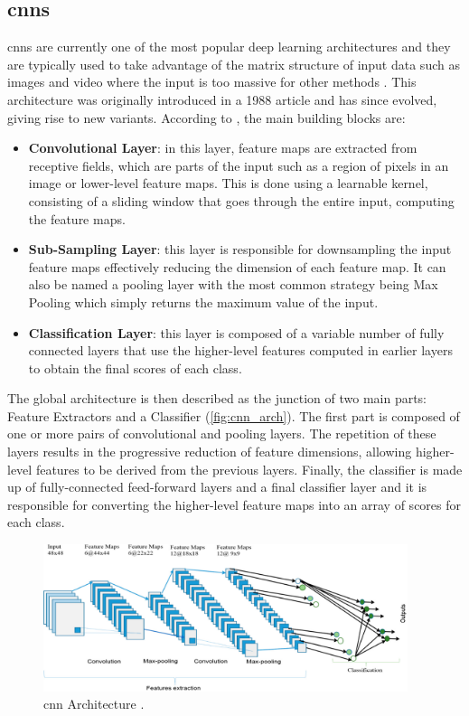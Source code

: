 \subsection{\acfp{cnn}}

\acfp{cnn} are currently one of the most popular deep learning architectures and they are typically used to take advantage of the matrix structure of input data such as images and video where the input is too massive for other methods \cite{Sarker2021}. This architecture was originally introduced in a 1988 article \cite{Fukushima1988} and has since evolved, giving rise to new variants. According to \textcite{Alom2019}, the main building blocks are:
\begin{itemize}
    \item \textbf{Convolutional Layer}: in this layer, feature maps are extracted from receptive fields, which are parts of the input such as a region of pixels in an image or lower-level feature maps. This is done using a learnable kernel, consisting of a sliding window that goes through the entire input, computing the feature maps.

    \item \textbf{Sub-Sampling Layer}: this layer is responsible for downsampling the input feature maps effectively reducing the dimension of each feature map. It can also be named a pooling layer with the most common strategy being Max Pooling which simply returns the maximum value of the input.

    \item \textbf{Classification Layer}: this layer is composed of a variable number of fully connected layers that use the higher-level features computed in earlier layers to obtain the final scores of each class.
\end{itemize}

The global architecture is then described as the junction of two main parts: Feature Extractors and a Classifier (\autoref{fig:cnn_arch}). The first part is composed of one or more pairs of convolutional and pooling layers. The repetition of these layers results in the progressive reduction of feature dimensions, allowing higher-level features to be derived from the previous layers. Finally, the classifier is made up of fully-connected feed-forward layers and a final classifier layer and it is responsible for converting the higher-level feature maps into an array of scores for each class.

\begin{figure}[ht]
    \centering
    \includegraphics[width=0.95\textwidth]{figs/cnn_arch.pdf}
    \caption[\acs{cnn} Architecture.]{\acs{cnn} Architecture \cite{Alom2019}.}
    \label{fig:cnn_arch}
\end{figure}

